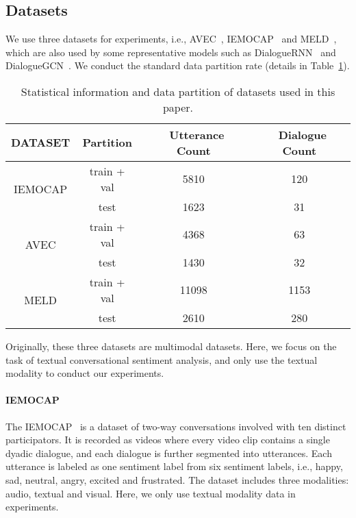 \documentclass[journal]{IEEEtran}
\begin{document}
\subsection{Datasets}
We use three datasets for experiments, i.e., AVEC~\cite{schuller2012avec}, IEMOCAP~\cite{busso2008iemocap} and MELD~\cite{poria2018meld}, which are also used by some representative models such as DialogueRNN~\cite{majumder2019dialoguernn} and DialogueGCN~\cite{ghosal2019dialoguegcn}. We conduct the standard data partition rate (details in Table~\ref{tab:data}).\begin{table}[!htb]
    \centering
\begin{tabular}{|c|c|c|c|}
        \hline
        DATASET & Partition & \ Utterance Count & \ Dialogue Count \\
        \hline
        \hline
        \multirow{2}{*}{IEMOCAP} & train + val & 5810 & 120 \\
        \cline{2-4}
        & test & 1623 & 31 \\
        \hline
        \multirow{2}{*}{AVEC} & train + val & 4368 & 63 \\
        \cline{2-4}
        & test & 1430 & 32 \\
        \hline
        \multirow{2}{*}{MELD} & train + val & 11098 & 1153 \\
        \cline{2-4}
        & test & 2610 & 280 \\
        \hline
    \end{tabular}
\caption{Statistical information and data partition of datasets used in this paper.}
    \label{tab:data}
\end{table}{}

Originally, these three datasets are multimodal datasets. Here, we focus on the task of textual conversational sentiment analysis, and only use the textual modality to conduct our experiments.

\paragraph{IEMOCAP}
The IEMOCAP~\cite{busso2008iemocap} is a dataset of two-way conversations involved with ten distinct participators. It is recorded as videos where every video clip contains a single dyadic dialogue, and each dialogue is further segmented into utterances. Each utterance is labeled as one sentiment label from six sentiment labels, i.e., happy, sad, neutral, angry, excited and frustrated. The dataset includes three modalities: audio, textual and visual. Here, we only use textual modality data in experiments.
\end{document}
